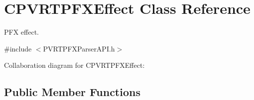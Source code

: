 \hypertarget{class_c_p_v_r_t_p_f_x_effect}{\section{C\+P\+V\+R\+T\+P\+F\+X\+Effect Class Reference}
\label{class_c_p_v_r_t_p_f_x_effect}
}


P\+F\+X effect.  




{\ttfamily \#include $<$P\+V\+R\+T\+P\+F\+X\+Parser\+A\+P\+I.\+h$>$}



Collaboration diagram for C\+P\+V\+R\+T\+P\+F\+X\+Effect\+:
\subsection*{Public Member Functions}
